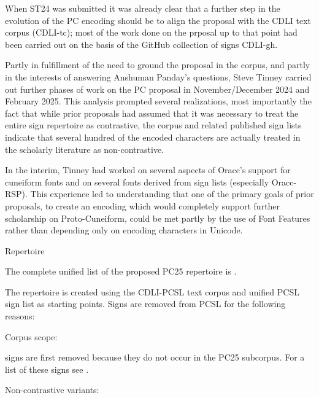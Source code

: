 \par When ST24 was submitted it was already clear that a further
      step in the evolution of the PC encoding should be to align the
      proposal with the CDLI text corpus (CDLI-tc); most of the work
      done on the prposal up to that point had been carried out on the
      basis of the GitHub collection of signs CDLI-gh.


\par Partly in fulfillment of the need to ground the proposal in
      the corpus, and partly in the interests of answering Anshuman
      Panday's questions, Steve Tinney carried out further phases of
      work on the PC proposal in November/December 2024 and February
      2025.  This analysis prompted several realizations, most importantly
      the fact that while prior proposals had assumed that it was
      necessary to treat the entire sign repertoire as contrastive,
      the corpus and related published sign lists indicate that
      several hundred of the encoded characters are actually treated
      in the scholarly literature as non-contrastive.


\par In the interim, Tinney had worked on several aspects of
      Oracc's support for cuneiform fonts and on several fonts derived
      from sign lists (especially Oracc-RSP).  This experience led to
      understanding that one of the primary goals of prior proposals,
      to create an encoding which would completely support further
      scholarship on Proto-Cuneiform, could be met partly by the use
      of Font Features rather than depending only on encoding
      characters in Unicode.

\Hh{}Repertoire


\par The complete unified list of the proposed PC25 repertoire is
      .


\par The repertoire is created using the CDLI-PCSL text corpus and
      unified PCSL sign list as starting points.  Signs are removed
      from PCSL for the following reasons:

\Hol\Hli{}\bgroup\remfor{}Corpus scope:\egroup{} 
	
	signs are first removed because they do not occur in the PC25
	subcorpus.  For a list of these signs see .

\Hli{}\bgroup\remfor{}Non-contrastive variants:\egroup{}

